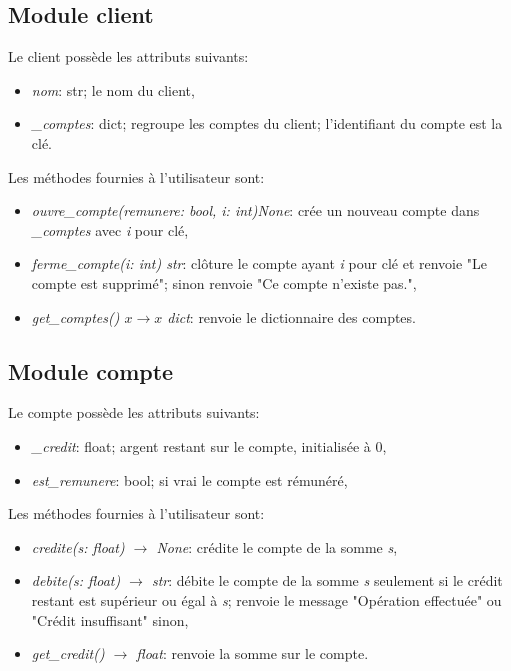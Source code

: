 \documentclass[a4paper,11pt]{article}
\begin{document}
\begin{Form}
\subsection{Module client}
Le client possède les attributs suivants:
\begin{itemize}
\item \emph{nom}: str; le nom du client,
\item \emph{\_comptes}: dict; regroupe les comptes du client; l'identifiant du compte est la clé.
\end{itemize}
Les méthodes fournies à l'utilisateur sont:
\begin{itemize}
\item \emph{ouvre\_compte(remunere: bool, i: int)\;\rightarrow\;None}: crée un nouveau compte dans \emph{\_comptes} avec \emph{i} pour clé,
\item \emph{ferme\_compte(i: int) \rightarrow str}: clôture le compte ayant \emph{i} pour clé et renvoie "Le compte est supprimé"; sinon renvoie "Ce compte n'existe pas.",
\item \emph{get\_comptes() $x\rightarrow x$ dict}: renvoie le dictionnaire des comptes.
\end{itemize}
\subsection{Module compte}
Le compte possède les attributs suivants:
\begin{itemize}
\item \emph{\_credit}: float; argent restant sur le compte, initialisée à 0,
\item \emph{est\_remunere}: bool; si vrai le compte est rémunéré,
\end{itemize}
Les méthodes fournies à l'utilisateur sont:
\begin{itemize}
\item \emph{credite(s: float) $\rightarrow$ None}: crédite le compte de la somme \emph{s},
\item \emph{debite(s: float) $\rightarrow$ str}: débite le compte de la somme \emph{s} seulement si le crédit restant est supérieur ou égal à \emph{s}; renvoie le message "Opération effectuée" ou "Crédit insuffisant" sinon,
\item \emph{get\_credit() $\rightarrow$ float}: renvoie la somme sur le compte.
\end{itemize}

\end{Form}
\end{document}

